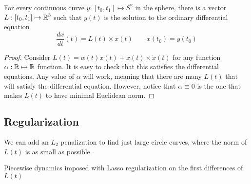 \begin{lemma}
For every continuous curve $y : [t_0, t_1] \mapsto S^2$ in the sphere, there is a vector $L : [t_0, t_1] \mapsto \operatorname{\mathbb{R}}^3$ such that $y(t)$ is the solution to the ordinary differential equation 
\begin{equation}
    \frac{dx}{dt}(t) = L(t) \times x(t) \qquad x(t_0) = y(t_0)
\end{equation}
\end{lemma}

\begin{proof}
Consider $L(t) = \alpha(t) x(t) + x(t) \times \dot x (t)$ for any function $\alpha : \operatorname{\mathbb{R}} \mapsto \operatorname{\mathbb{R}}$ function. 
It is easy to check that this satisfies the differential equations. 
Any value of $\alpha$ will work, meaning that there are many $L(t)$ that will satisfy the differential equation.
However, notice that $\alpha \equiv 0$ is the one that makes $L(t)$ to have minimal Euclidean norm. 
\end{proof}



\subsection{Regularization}

We can add an $L_2$ penalization to find just large circle curves, where the norm of $L(t)$ is as small as possible. 

Piecewise dynamics imposed with Lasso regularization on the first differences of $L(t)$
